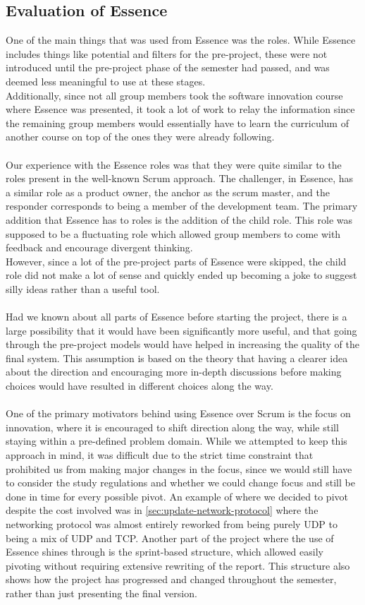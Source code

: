 \subsection{Evaluation of Essence}
One of the main things that was used from Essence was the roles.
While Essence includes things like potential and filters for the pre-project, these were not introduced until the pre-project phase of the semester had passed, and was deemed less meaningful to use at these stages.\\
Additionally, since not all group members took the software innovation course where Essence was presented, it took a lot of work to relay the information since the remaining group members would essentially have to learn the curriculum of another course on top of the ones they were already following.
\\\\
Our experience with the Essence roles was that they were quite similar to the roles present in the well-known Scrum approach.
The challenger, in Essence, has a similar role as a product owner, the anchor as the scrum master, and the responder corresponds to being a member of the development team.
The primary addition that Essence has to roles is the addition of the child role.
This role was supposed to be a fluctuating role which allowed group members to come with feedback and encourage divergent thinking.\\
However, since a lot of the pre-project parts of Essence were skipped, the child role did not make a lot of sense and quickly ended up becoming a joke to suggest silly ideas rather than a useful tool.
\\\\
Had we known about all parts of Essence before starting the project, there is a large possibility that it would have been significantly more useful, and that going through the pre-project models would have helped in increasing the quality of the final system.
This assumption is based on the theory that having a clearer idea about the direction and encouraging more in-depth discussions before making choices would have resulted in different choices along the way.
\\\\
One of the primary motivators behind using Essence over Scrum is the focus on innovation, where it is encouraged to shift direction along the way, while still staying within a pre-defined problem domain.
While we attempted to keep this approach in mind, it was difficult due to the strict time constraint that prohibited us from making major changes in the focus, since we would still have to consider the study regulations and whether we could change focus and still be done in time for every possible pivot.
An example of where we decided to pivot despite the cost involved was in \autoref{sec:update-network-protocol} where the networking protocol was almost entirely reworked from being purely UDP to being a mix of UDP and TCP.
Another part of the project where the use of Essence shines through is the sprint-based structure, which allowed easily pivoting without requiring extensive rewriting of the report.
This structure also shows how the project has progressed and changed throughout the semester, rather than just presenting the final version.
